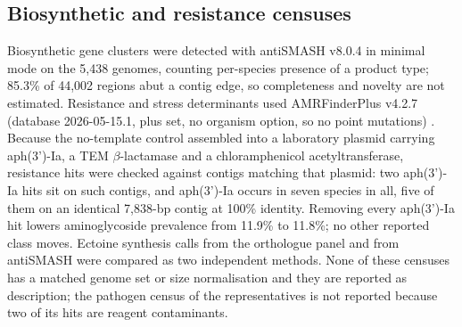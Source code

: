 \documentclass[11pt]{article}
\begin{document}
\subsection*{Biosynthetic and resistance censuses}
Biosynthetic gene clusters were detected with antiSMASH v8.0.4 \citep{blin2025antismash8} in minimal
mode on the 5{,}438 genomes, counting per-species presence of a product type; 85.3\% of 44{,}002
regions abut a contig edge, so completeness and novelty are not estimated. Resistance and stress
determinants used AMRFinderPlus v4.2.7 (database 2026-05-15.1, plus set, no organism option, so no
point mutations) \citep{feldgarden2021amrfinderplus}. Because the no-template control assembled into a
laboratory plasmid carrying aph(3')-Ia, a TEM $\beta$-lactamase and a chloramphenicol
acetyltransferase, resistance hits were checked against contigs matching that plasmid: two
aph(3')-Ia hits sit on such contigs, and aph(3')-Ia occurs in seven species in all, five of them on
an identical 7{,}838-bp contig at 100\% identity. Removing every aph(3')-Ia hit lowers aminoglycoside
prevalence from 11.9\% to 11.8\%; no other reported class moves. Ectoine synthesis calls from the orthologue
panel and from antiSMASH were compared as two independent methods. None of these censuses has a
matched genome set or size normalisation and they are reported as description; the pathogen census
of the representatives is not reported because two of its hits are reagent contaminants.
\end{document}
